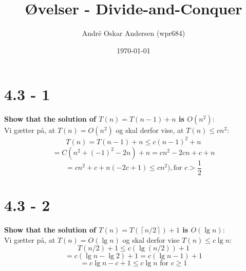 \documentclass{report}
\title{Øvelser - Divide-and-Conquer}
\author{André Oskar Andersen (wpr684)}
\date{\today}
\begin{document}
\maketitle

\section*{4.3 - 1}
\textbf{Show that the solution of $T(n) = T(n - 1) + n$ is $O(n^2)$}: \\
Vi gætter på, at $T(n) = O(n^2)$ og skal derfor vise, at $T(n) \leq cn^2$:
$$T(n) = T(n - 1) + n \leq c(n - 1)^2 + n$$
$$= C(n^2 + (-1)^2 - 2n) + n = cn^2 - 2cn + c + n$$
$$ = cn^2 + c + n(-2c + 1) \leq cn^2), \text{for $c > \frac{1}{2}$}$$

\section*{4.3 - 2}
\textbf{Show that the solution of $T(n) = T(\left \lceil{n/2}\right \rceil) + 1$ is $O(\lg n)$}: \\
Vi gætter på, at $T(n) = O(\lg n)$ og skal derfor vise $T(n) \leq c \lg n$:
$$T(n/2) + 1 \leq c(\lg(n/2)) + 1 $$
$$ = c(\lg n - \lg 2) + 1 = c(\lg n - 1) + 1 $$
$$ = c \lg n - c + 1 \leq c \lg n \text{ for $c \geq 1$}$$
\end{document}
